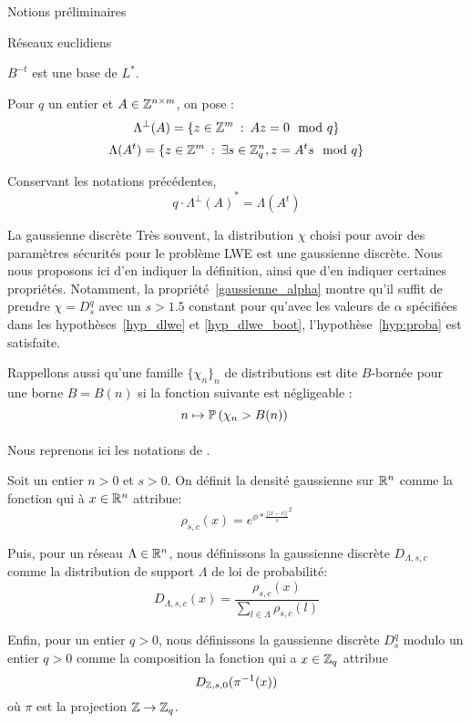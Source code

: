 \begin{section}{Notions préliminaires}
\begin{subsection}{Réseaux euclidiens}
\begin{prop}
	$B^{-t}$ est une base de $L^*$.
	\end{prop}

	Pour $q$ un entier et $A \in \mathbb{Z}^{n\times m}$, on pose :
		\[\Lambda^\bot(A) = \{ z \in \mathbb{Z}^m\: :\: A z  = 0 \mod q \}\] 
	\[\Lambda(A^t) = \{ z \in \mathbb{Z}^m\: : \: \exists s\in \mathbb{Z}_q^n, z = A^t s \mod q\}\]

		\begin{prop} \label{lambda_reseau}
	Conservant les notations précédentes, 
	\[q \cdot {\Lambda^\bot(A)}^* =  \Lambda(A^t)\] 
	\end{prop}
	\end{subsection}
	
	\begin{subsection}{La gaussienne discrète}
	Très souvent, la distribution $\chi$ choisi pour avoir des paramètres sécurités pour le problème LWE est une gaussienne discrète. Nous nous proposons ici d'en indiquer la définition, ainsi que d'en indiquer certaines propriétés.
Notamment, la propriété~\ref{gaussienne_alpha} montre qu'il suffit 
de prendre $\chi = D^q_s$ avec un $s > 1.5$ constant pour 
qu'avec les valeurs de $\alpha$ spécifiées dans les hypothèses~\ref{hyp_dlwe} et
\ref{hyp_dlwe_boot}, 
l'hypothèse~\ref{hyp:proba} est satisfaite.

	Rappellons aussi qu'une famille $\{\chi_n\}_n$ de distributions est dite $B$-bornée pour une borne $B = B(n)$ si la fonction suivante est négligeable :
		\[n \mapsto \PP\left(\chi_n > B(n)\right) \]

	\paragraph{}
	Nous reprenons ici les notations de \cite{STOC:GenPeiVai08}.

	Soit un entier $n > 0$  et $s > 0$. On définit la densité gaussienne sur $\mathbb{R}^n$ comme la fonction qui à $x\in\mathbb{R}^n$ attribue:
	\[\rho_{s,c}(x) = e^{\phi * {\frac{||x-c||}{s}}^2} \]

	Puis, pour un réseau $\Lambda \in \mathbb{R}^n$, nous définissons la
	gaussienne discrète $D_{\Lambda,s,c}$ comme la distribution de support $\Lambda$ de loi de probabilité: 	
	\[ D_{\Lambda, s, c}(x) = \frac{\rho_{s,c}(x)}{\sum_{l\in \Lambda}\rho_{s,c}(l)}\]

	Enfin, pour un entier $q > 0$, nous définissons la gaussienne discrète
	$D^q_{s}$ modulo un entier $q > 0$ comme la composition la fonction qui a $x \in \mathbb{Z}_q$ attribue 
		\[ D_{\mathbb{Z}, s, 0}(\pi^{-1}(x)) \]
	où $\pi$ est la projection $\mathbb{Z} \rightarrow \mathbb{Z}_q$.


\end{subsection}
\end{section}
